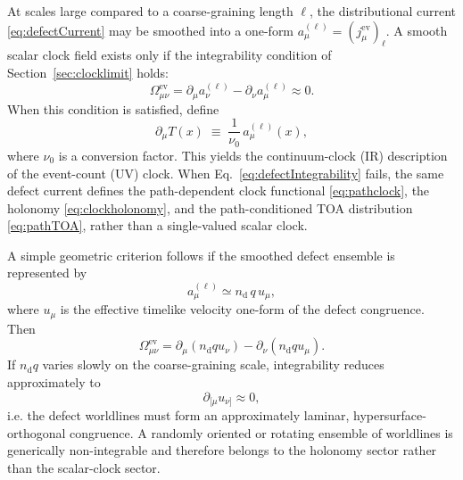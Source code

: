 \documentclass[11pt, a4paper]{article}
\theoremstyle{definition}
\theoremstyle{plain}
\theoremstyle{remark}
\numberwithin{equation}{section}
\begin{document}
        At scales large compared to a coarse-graining length $\ell$, the distributional current \eqref{eq:defectCurrent} may be smoothed into a one-form $a^{(\ell)}_\mu=(j^{\mathrm{ev}}_\mu)_\ell$. A smooth scalar clock field exists only if the integrability condition of Section~\ref{sec:clocklimit} holds:
        \begin{equation}
            \Omega^{\mathrm{ev}}_{\mu\nu}
            =
            \partial_\mu a^{(\ell)}_\nu-\partial_\nu a^{(\ell)}_\mu
            \approx 0 .
            \label{eq:defectIntegrability}
        \end{equation}
        When this condition is satisfied, define
        \begin{equation}
            \partial_\mu T(x)
            \;\equiv\;
            \frac{1}{\nu_0}\,a^{(\ell)}_\mu(x),
            \label{eq:TFromEvents}
        \end{equation}
        where $\nu_0$ is a conversion factor. This yields the continuum-clock (IR) description of the event-count (UV) clock. When Eq.~\eqref{eq:defectIntegrability} fails, the same defect current defines the path-dependent clock functional \eqref{eq:pathclock}, the holonomy \eqref{eq:clockholonomy}, and the path-conditioned TOA distribution \eqref{eq:pathTOA}, rather than a single-valued scalar clock.

        A simple geometric criterion follows if the smoothed defect ensemble is represented by
        \begin{equation}
            a^{(\ell)}_\mu \simeq n_{\mathrm d}\,q\,u_\mu,
            \label{eq:defectLaminarAnsatz}
        \end{equation}
        where $u_\mu$ is the effective timelike velocity one-form of the defect congruence. Then
        \begin{equation}
            \Omega^{\mathrm{ev}}_{\mu\nu}
            =
            \partial_\mu(n_{\mathrm d}q u_\nu)
            -
            \partial_\nu(n_{\mathrm d}q u_\mu).
            \label{eq:defectOmega}
        \end{equation}
        If $n_{\mathrm d}q$ varies slowly on the coarse-graining scale, integrability reduces approximately to
        \begin{equation}
            \partial_{[\mu}u_{\nu]}\approx0,
            \label{eq:defectHypersurfaceOrthogonal}
        \end{equation}
        i.e. the defect worldlines must form an approximately laminar, hypersurface-orthogonal congruence. A randomly oriented or rotating ensemble of worldlines is generically non-integrable and therefore belongs to the holonomy sector rather than the scalar-clock sector.
    
\end{document}
